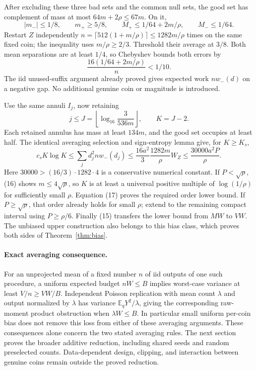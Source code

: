 \documentclass[11pt]{article}
\newcommand{\E}{\mathbb E}
\begin{document}
After excluding these three bad sets and the common null sets, the good set
has complement of mass at most $64m+2\rho\le67m$. On it,
\[
 |m_-|\le1/8,\qquad m_+\ge5/8,\qquad
 M_+\le1/64+2m/\rho,\qquad M_-\le1/64.
\]
Restart $Z$ independently
$n=\lceil512(1+m/\rho)\rceil\le1282m/\rho$ times on the same fixed coin;
the inequality uses $m/\rho\ge2/3$. Threshold their average at $3/8$.
Both mean separations are at least $1/4$, so Chebyshev bounds both errors by
\[
 \frac{16(1/64+2m/\rho)}{n}<1/10.
\]
The iid unused-suffix argument already proved gives expected work $nw_-(d)$
on a negative gap. No additional genuine coin or magnitude is introduced.

Use the same annuli $I_j$, now retaining
\[
 j\le J=\left\lfloor\log_{16}\frac3{536m}\right\rfloor,
 \qquad K=J-2.
\]
Each retained annulus has mass at least $134m$, and the good set occupies at
least half. The identical averaging selection and sign-entropy lemma give,
for $K\ge K_s$,
\[
 c_sK\log K
 \le\sum_jd_j^2nw_-(d_j)
 \le\frac{16a^2}{3}\frac{1282m}{\rho}W_Z
 \le\frac{30000a^2P}{\rho}.                             \tag{17}
\]
Here $30000>(16/3)\cdot1282\cdot4$ is a conservative numerical constant.
If $P<\sqrt\rho$, (16) shows $m\le4\sqrt\rho$, so $K$ is at least a
universal positive multiple of $\log(1/\rho)$ for sufficiently small $\rho$.
Equation (17) proves the required order lower bound. If $P\ge\sqrt\rho$,
that order already holds for small $\rho$; extend to the remaining compact
interval using $P\ge\rho/6$. Finally (15) transfers the lower bound from
$MW$ to $VW$. The unbiased upper construction also belongs to this bias class,
which proves both sides of Theorem~\ref{thm:bias}.

\paragraph{Exact averaging consequence.}
For an unprojected mean of a fixed number $n$ of iid outputs of one such
procedure, a uniform expected budget $nW\le B$ implies worst-case variance
at least $V/n\ge VW/B$. Independent Poisson replication with mean count
$\lambda$ and output normalized by $\lambda$ has variance
$\E_qY^2/\lambda$, giving the corresponding raw-moment product obstruction
when $\lambda W\le B$. In particular small uniform per-coin bias does not
remove this loss from either of these averaging arguments.
These consequences alone concern the two stated averaging rules. The next
section proves the broader additive reduction, including shared seeds and
random preselected counts. Data-dependent design, clipping, and interaction
between genuine coins remain outside the proved reduction.
\end{document}
